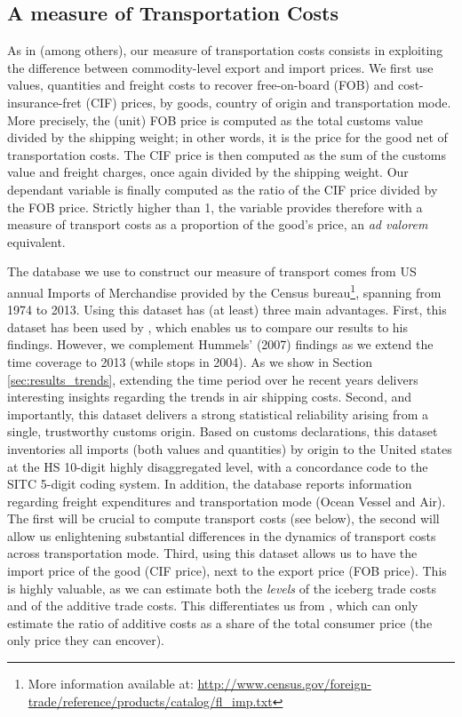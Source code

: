 \documentclass[a4paper,11pt]{article}
\begin{document}
\subsection{A measure of Transportation Costs}

As in \cite{hummels2007} (among others), our measure of transportation costs consists in exploiting the difference between commodity-level export and import prices.
We first use values, quantities and freight costs to recover free-on-board (FOB) and cost-insurance-fret (CIF) prices, by goods, country of origin and transportation mode. More precisely, the (unit) FOB price is computed as the total customs value divided by the shipping weight; in other words, it is the price for the good net of transportation costs. The CIF price is then computed as the sum of the customs value and freight charges, once again divided by the shipping weight. Our dependant variable is finally computed as the ratio of the CIF price divided by the FOB price. Strictly higher than 1, the variable provides therefore with a measure of transport costs as a proportion of the good's price, an \emph{ad valorem} equivalent.

The database we use to construct our measure of transport comes from US annual Imports of Merchandise provided by the Census bureau\footnote{More information available at: \url{http://www.census.gov/foreign-trade/reference/products/catalog/fl_imp.txt}}, spanning from 1974 to 2013. Using this dataset has (at least) three main advantages. First, this dataset has been used by \cite{hummels2007}, which enables us to compare our results to his findings. However, we complement Hummels' (2007) findings as we extend the time coverage to 2013 (while \cite{hummels2007} stops in 2004). As we show in Section \ref{sec:results_trends}, extending the time period over he recent years delivers interesting insights regarding the trends in air shipping costs. Second, and importantly, this dataset delivers a strong statistical reliability arising from a single, trustworthy customs origin. Based on customs declarations, this dataset inventories all imports (both values and quantities) by origin to the United states at the HS 10-digit highly disaggregated level, with a concordance code to the SITC 5-digit coding system. In addition, the database reports information regarding freight expenditures and transportation mode (Ocean Vessel and Air). The first will be crucial to compute transport costs (see below), the second will allow us enlightening substantial differences in the dynamics of transport costs across transportation mode. Third, using this dataset allows us to have the import price of the good (CIF price), next to the export price (FOB price). This is highly valuable, as we can estimate both the \textit{levels} of the iceberg trade costs and of the additive trade costs. This differentiates us from \citet{Irrazabal_2015}, which can only estimate the ratio of additive costs as a share of the total consumer price (the only price they can encover).
\end{document}
